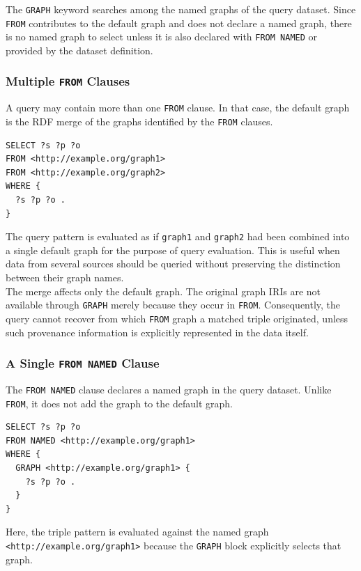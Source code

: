 \documentclass{scrbook}
\begin{document}
	The \texttt{GRAPH} keyword searches among the named graphs of the query dataset. Since \texttt{FROM} contributes to the default graph and does not declare a named graph, there is no named graph to select unless it is also declared with \texttt{FROM NAMED} or provided by the dataset definition.
	
	\subsubsection{Multiple \texttt{FROM} Clauses}
	
	A query may contain more than one \texttt{FROM} clause. In that case, the default graph is the RDF merge of the graphs identified by the \texttt{FROM} clauses.
	
	\begin{lstlisting}
SELECT ?s ?p ?o
FROM <http://example.org/graph1>
FROM <http://example.org/graph2>
WHERE {
  ?s ?p ?o .
}
	\end{lstlisting}
	
	The query pattern is evaluated as if \texttt{graph1} and \texttt{graph2} had been combined into a single default graph for the purpose of query evaluation. This is useful when data from several sources should be queried without preserving the distinction between their graph names.\\
	
	The merge affects only the default graph. The original graph IRIs are not available through \texttt{GRAPH} merely because they occur in \texttt{FROM}. Consequently, the query cannot recover from which \texttt{FROM} graph a matched triple originated, unless such provenance information is explicitly represented in the data itself.
	
	\subsubsection{A Single \texttt{FROM NAMED} Clause}
	
	The \texttt{FROM NAMED} clause declares a named graph in the query dataset. Unlike \texttt{FROM}, it does not add the graph to the default graph.
	
	\begin{lstlisting}
SELECT ?s ?p ?o
FROM NAMED <http://example.org/graph1>
WHERE {
  GRAPH <http://example.org/graph1> {
    ?s ?p ?o .
  }
}
	\end{lstlisting}
	
	Here, the triple pattern is evaluated against the named graph \texttt{<http://example.org/graph1>} because the \texttt{GRAPH} block explicitly selects that graph.\\
	
\end{document}

